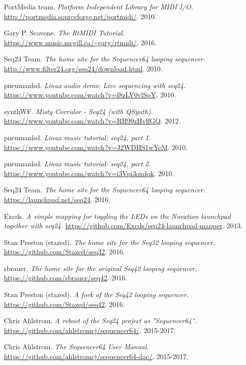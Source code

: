 \begin{thebibliography}{99}
   PortMedia team.
   \emph{Platform Independent Library for MIDI I/O.}
   \url{http://portmedia.sourceforge.net/portmidi/}.
   2010.

   Gary P. Scavone.
   \emph{The RtMIDI Tutorial.}
   \url{https://www.music.mcgill.ca/~gary/rtmidi/}.
   2016.

   Seq24 Team.
   \emph{The home site for the Sequencer64 looping sequencer.}
   \url{http://www.filter24.org/seq24/download.html}.
   2010.

   pneumanlsd.
   \emph{Linux audio demo: Live sequencing with seq24.}
   \url{https://www.youtube.com/watch?v=f8zLV0vlSpY}.
   2010.

   synthWF.
   \emph{Misty Corridor - Seq24 (with QSynth).}
   \url{https://www.youtube.com/watch?v=RH99zHvffGQ}.
   2012.

   pneumanlsd.
   \emph{Linux music tutorial: seq24, part 1.}
   \url{https://www.youtube.com/watch?v=J2WDHS1wYeM}.
   2010.
   
   pneumanlsd.
   \emph{Linux music tutorial: seq24, part 2.}
   \url{https://www.youtube.com/watch?v=i3Vpi3oxdqk}.
   2010.

   Seq24 Team.
   \emph{The home site for the Sequencer64 looping sequencer.}
   \url{https://launchpad.net/seq24}.
   2016.

   Excds.
   \emph{A simple mapping for toggling the LEDs on the Novation launchpad
   together with seq24.}
   \url{https://github.com/Excds/seq24-launchpad-mapper}.
   2013.

   Stan Preston (stazed).
   \emph{The home site for the Seq32 looping sequencer.}
   \url{https://github.com/Stazed/seq32}.
   2016.

   sbrauer.
   \emph{The home site for the original Seq42 looping sequencer.}
   \url{https://github.com/sbrauer/seq42}.
   2016.

   Stan Preston (stazed).
   \emph{A fork of the Seq42 looping sequencer.}
   \url{https://github.com/Stazed/seq42}.
   2016.

   Chris Ahlstrom.
   \emph{A reboot of the Seq24 project as "Sequencer64".}
   \url{https://github.com/ahlstromcj/sequencer64/}.
   2015-2017.

   Chris Ahlstrom.
   \emph{The Sequencer64 User Manual.}
   \url{https://github.com/ahlstromcj/sequencer64-doc/}.
   2015-2017.


\end{thebibliography}
